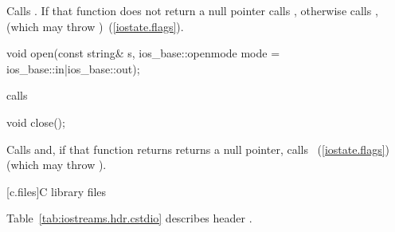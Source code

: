 \begin{itemdescr}
\pnum
\effects
Calls
.
If that function does not return a null pointer calls ,
otherwise calls
,
(which may throw
)~(\ref{iostate.flags}).
\end{itemdescr}

%
\begin{itemdecl}
void open(const string& s,
    ios_base::openmode mode = ios_base::in|ios_base::out);
\end{itemdecl}

\begin{itemdescr}
\pnum
\effects calls 
\end{itemdescr}

%
\begin{itemdecl}
void close();
\end{itemdecl}

\begin{itemdescr}
\pnum
\effects
Calls
and, if that function returns
returns a null pointer,
calls
~(\ref{iostate.flags})
(which may throw
).
\end{itemdescr}

[c.files]{C library files}

\pnum
Table~\ref{tab:iostreams.hdr.cstdio} describes header .

